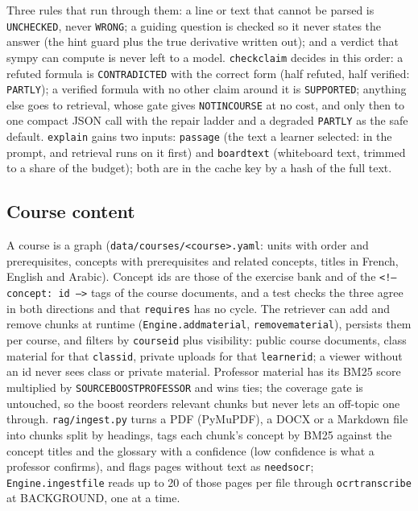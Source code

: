 \documentclass[11pt,a4paper]{article}
\renewcommand{\_}{\origus\allowbreak}
\begin{document}
\medskip\noindent Three rules that run through them: a line or text that cannot be parsed is \texttt{UNCHECKED}, never \texttt{WRONG};
a guiding question is checked so it never states the answer (the hint guard plus the true derivative written out); and a
verdict that sympy can compute is never left to a model. \texttt{check\_claim} decides in this order: a refuted formula is
\texttt{CONTRADICTED} with the correct form (half refuted, half verified: \texttt{PARTLY}); a verified formula with no other
claim around it is \texttt{SUPPORTED}; anything else goes to retrieval, whose gate gives \texttt{NOT\_IN\_COURSE} at no cost, and
only then to one compact JSON call with the repair ladder and a degraded \texttt{PARTLY} as the safe default.
\texttt{explain} gains two inputs: \texttt{passage} (the text a learner selected: in the prompt, and retrieval runs on it first)
and \texttt{board\_text} (whiteboard text, trimmed to a share of the budget); both are in the cache key by a hash of the full text.

\subsection{Course content}

A course is a graph (\texttt{data/courses/<course>.yaml}: units with order and prerequisites, concepts with prerequisites and related
concepts, titles in French, English and Arabic). Concept ids are those of the exercise bank and of the \texttt{<!-- concept: id -->}
tags of the course documents, and a test checks the three agree in both directions and that \texttt{requires} has no cycle.
The retriever can add and remove chunks at runtime (\texttt{Engine.add\_material}, \texttt{remove\_material}), persists them per
course, and filters by \texttt{course\_id} plus visibility: public course documents, class material for that \texttt{class\_id},
private uploads for that \texttt{learner\_id}; a viewer without an id never sees class or private material. Professor material
has its BM25 score multiplied by \texttt{SOURCE\_BOOST\_PROFESSOR} and wins ties; the coverage gate is untouched, so the boost reorders
relevant chunks but never lets an off-topic one through. \texttt{rag/ingest.py} turns a PDF (PyMuPDF), a DOCX or a Markdown file into
chunks split by headings, tags each chunk's concept by BM25 against the concept titles and the glossary with a confidence (low
confidence is what a professor confirms), and flags pages without text as \texttt{needs\_ocr}; \texttt{Engine.ingest\_file} reads up
to 20 of those pages per file through \texttt{ocr\_transcribe} at BACKGROUND, one at a time.
\end{document}
